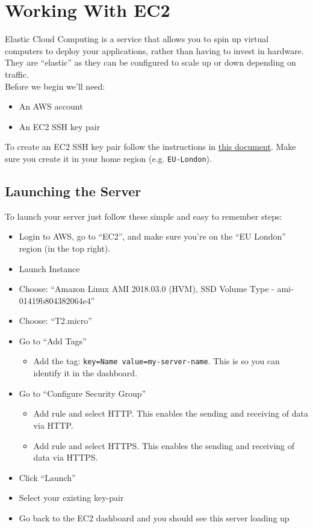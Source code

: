 \section{Working With EC2}

Elastic Cloud Computing is a service that allows you to spin up virtual computers to deploy your applications, rather than having to invest in hardware. They are ``elastic'' as they can be configured to scale up or down depending on traffic.
\\

Before we begin we'll need:

\begin{itemize}
    \item An AWS account
    \item An EC2 SSH key pair
\end{itemize}

To create an EC2 SSH key pair follow the instructions in \href{https://docs.aws.amazon.com/AWSEC2/latest/UserGuide/ec2-key-pairs.html#having-ec2-create-your-key-pair}{this document}. Make sure you create it in your home region (e.g. \texttt{EU-London}).

\subsection{Launching the Server}

To launch your server just follow these simple and easy to remember steps:

\begin{itemize}
    \item Login to AWS, go to ``EC2'', and make sure you're on the ``EU London'' region (in the top right).
    \item Launch Instance
    \item Choose: ``Amazon Linux AMI 2018.03.0 (HVM), SSD Volume Type - ami-01419b804382064e4''
    \item Choose: ``T2.micro''
    \item Go to ``Add Tags''
        \begin{itemize}
            \item Add the tag: \texttt{key=Name value=my-server-name}. This is so you can identify it in the dashboard.
        \end{itemize}
    \item Go to ``Configure Security Group''
        \begin{itemize}
            \item Add rule and select HTTP. This enables the sending and receiving of data via HTTP.
            \item Add rule and select HTTPS. This enables the sending and receiving of data via HTTPS.
        \end{itemize}
    \item Click ``Launch''
    \item Select your existing key-pair
    \item Go back to the EC2 dashboard and you should see this server loading up
\end{itemize}

